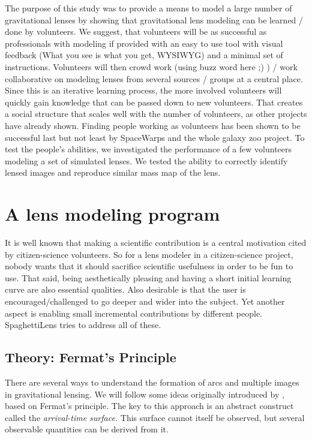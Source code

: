 \documentclass[12pt,preprint]{aastex}
\newcommand{\spl}{SpaghettiLens\xspace}
\newcommand{\sw}{SpaceWarps\xspace}
\newcommand{\todo}[2][red]{%
\textcolor{#1}{\textbullet}%
\marginpar{\colorbox{#1}{\parbox{\marginparwidth}{%
\setstretch{0.4}\sffamily\textcolor{black}{\scriptsize{#2}}}}}}
\newcommand{\needcite}[1][]{\todo[green]{cit #1}}
\begin{document}
The purpose of this study was to provide a means to model a large number of gravitational lenses by showing that gravitational lens modeling can be learned / done by volunteers.
We suggest, that volunteers will be as successful as professionals with modeling if provided with an easy to use tool with visual feedback (What you see is what you get, WYSIWYG) and a minimal set of instructions.
Volunteers will then crowd work (using buzz word here ;) ) / work collaborative on modeling lenses from several sources / groups at a central place.
Since this is an iterative learning process, the more involved volunteers will quickly gain knowledge that can be passed down to new volunteers.
That creates a social structure that scales well with the number of volunteers, as other projects\needcite have already shown.
Finding people working as volunteers has been shown to be successful last but not least by \sw and the whole galaxy zoo project.
To test the people's abilities, we investigated the performance of a few volunteers modeling a set of simulated lenses.
We tested the ability to correctly identify lensed images and reproduce similar mass map of the lens.


\section{A lens modeling program}

It is well known that making a scientific contribution is a central
motivation cited by citizen-science volunteers.  So for a lens
modeler in a citizen-science project, nobody wants that it should
sacrifice scientific usefulness in order to be fun to use.  That said,
being aesthetically pleasing and having a short initial learning curve
are also essential qualities.  Also desirable is that the user is
encouraged/challenged to go deeper and wider into the subject.
Yet another aspect is enabling small incremental contributions
by different people.  \spl tries to address all of these.

\subsection{Theory: Fermat's Principle} \label{sec:Fermat}

There are several ways to understand the formation of arcs and
multiple images in gravitational lensing.  We will follow some ideas
originally introduced by \cite{1986ApJ...310..568B}, based on Fermat's
principle.  The key to this approach is an abstract construct called
the {\em arrival-time surface.}  This surface cannot itself be
observed, but several observable quantities can be derived from it.
\end{document}
